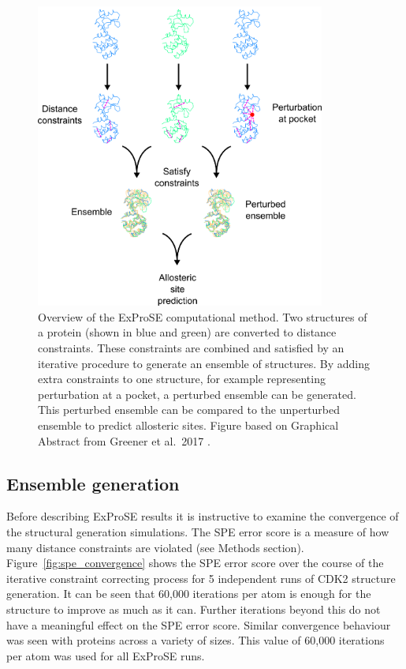 \begin{figure}
\centering

\includegraphics[width=0.85\textwidth]{figures/exprose_overview/exprose_overview}

\caption[Overview of the ExProSE computational method to generate and perturb ensembles of protein structures]
{Overview of the ExProSE computational method.
Two structures of a protein (shown in blue and green) are converted to distance constraints.
These constraints are combined and satisfied by an iterative procedure to generate an ensemble of structures.
By adding extra constraints to one structure, for example representing perturbation at a pocket, a perturbed ensemble can be generated.
This perturbed ensemble can be compared to the unperturbed ensemble to predict allosteric sites.
Figure based on Graphical Abstract from Greener et al.\ 2017 \cite{Greener2017}.}

\label{fig:exprose_overview}
\end{figure}


\subsection{Ensemble generation}

Before describing ExProSE results it is instructive to examine the convergence of the structural generation simulations.
The SPE error score is a measure of how many distance constraints are violated (see Methods section).
Figure~\ref{fig:spe_convergence} shows the SPE error score over the course of the iterative constraint correcting process for 5 independent runs of CDK2 structure generation.
It can be seen that 60,000 iterations per atom is enough for the structure to improve as much as it can.
Further iterations beyond this do not have a meaningful effect on the SPE error score.
Similar convergence behaviour was seen with proteins across a variety of sizes.
This value of 60,000 iterations per atom was used for all ExProSE runs.


